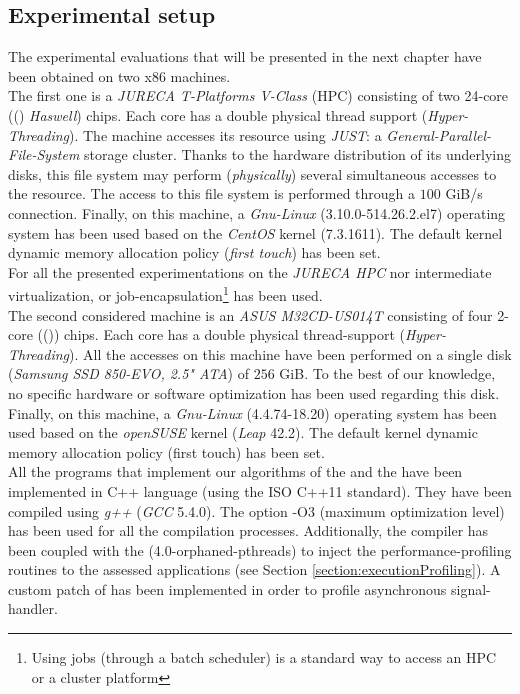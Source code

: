 	\subsection{Experimental setup}\label{section:experimentalSetup}
		The experimental evaluations that will be presented in the next chapter have been obtained on two x86 machines.\\
		The first one is a \emph{JURECA T-Platforms V-Class} (HPC) consisting of two 24-core (\targetPlatformHpcProcessor\space (\targetPlatformHpcFrequency) \emph{Haswell}) chips.   Each core has a double physical thread support (\emph{Hyper-Threading}).   The machine accesses its \notationIO\space resource using \emph{JUST}\cite{just}: a \emph{General-Parallel-File-System} storage cluster.   Thanks to the hardware distribution of its underlying disks, this file system may perform (\emph{physically}) several simultaneous accesses to the \notationIO\space resource.   The access to this file system is performed through a $100$ GiB/s connection.   Finally, on this machine, a \emph{Gnu-Linux} (3.10.0-514.26.2.el7) operating system has been used based on the \emph{CentOS} kernel (7.3.1611).   The default kernel dynamic memory allocation policy (\emph{first touch}) has been set.\\
		For all the presented experimentations on the \emph{JURECA HPC} nor intermediate virtualization, or job-encapsulation\footnote{Using jobs (through a batch scheduler) is a standard way to access an HPC or a cluster platform} has been used.\\

		The second considered machine is an \emph{ASUS M32CD-US014T} consisting of four 2-core (\targetPlatformLaptop\space (\targetPlatformLaptopFrequency)) chips.   Each core has a double physical thread-support (\emph{Hyper-Threading}).   All the \notationIO\space accesses on this machine have been performed on a single disk (\emph{Samsung SSD 850-EVO, 2.5" ATA}) of $256$ GiB.   To the best of our knowledge, no specific hardware or software optimization has been used regarding this disk.   Finally, on this machine, a \emph{Gnu-Linux} (4.4.74-18.20) operating system has been used based on the \emph{openSUSE} kernel (\emph{Leap} 42.2).   The default kernel dynamic memory allocation policy (first touch) has been set.\\

		All the programs that implement our algorithms of the \toolTargetSoftware\space and the \toolSimulationSoftware\space have been implemented in C++ language (using the ISO C++11 standard).   They have been compiled using \textit{g++} (\emph{GCC} 5.4.0).  The option -O3 (maximum optimization level) has been used for all the compilation processes.   Additionally, the compiler has been coupled with the \toolProfiling\space (4.0-orphaned-pthreads) to inject the performance-profiling routines to the assessed applications (see Section \ref{section:executionProfiling}).   A custom patch of \toolProfiling\space has been implemented in order to profile asynchronous signal-handler.\\

